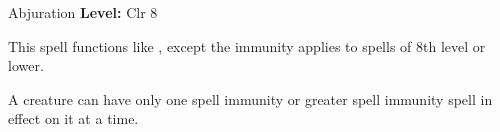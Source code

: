 {Abjuration}
{
	\textbf{Level:}
	Clr 8\\
}
{
	This spell functions like , except the immunity applies to spells of 8th level or lower.

	A creature can have only one spell immunity or greater spell immunity spell in effect on it at a time.

}
